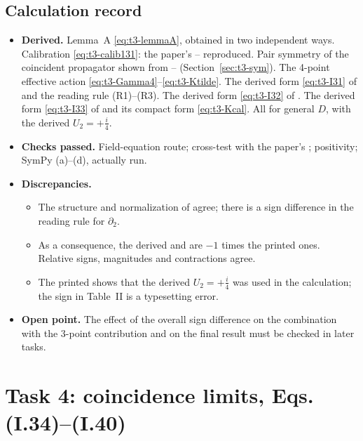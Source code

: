 \subsection{Calculation record}
\begin{itemize}
\item \textbf{Derived.} Lemma~A \eqref{eq:t3-lemmaA}, obtained in two independent ways.
Calibration \eqref{eq:t3-calib131}: the paper's -- reproduced. Pair
symmetry of the coincident propagator shown from --
(Section~\ref{sec:t3-sym}). The 4-point effective action
\eqref{eq:t3-Gamma4}--\eqref{eq:t3-Ktilde}. The derived form \eqref{eq:t3-I31} of
 and the reading rule (R1)--(R3). The derived form \eqref{eq:t3-I32} of .
The derived form \eqref{eq:t3-I33} of  and its compact form \eqref{eq:t3-Kcal}.
All for general \(D\), with the derived \(U_2=+\tfrac i4\).
\item \textbf{Checks passed.} Field-equation route; cross-test with the paper's ;
positivity; SymPy (a)--(d), actually run.
\item \textbf{Discrepancies.}
\begin{itemize}[nosep]
\item The structure and normalization of  agree; there is a sign difference in the
reading rule for \(\partial_2\).
\item As a consequence, the derived  and  are \(-1\) times the printed ones.
Relative signs, magnitudes and contractions agree.
\item The printed  shows that the derived \(U_2=+\tfrac i4\) was used in the
calculation; the sign in Table~II is a typesetting error.
\end{itemize}
\item \textbf{Open point.} The effect of the overall sign difference on the combination with
the 3-point contribution and on the final result must be checked in later tasks.
\end{itemize}

\section{Task 4: coincidence limits, Eqs. (I.34)--(I.40)}
\label{sec:t4}

